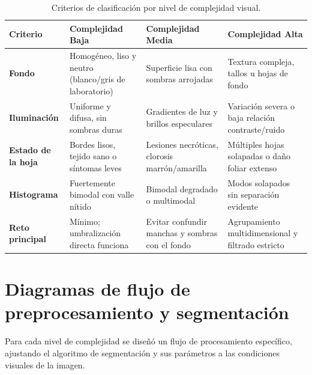 \documentclass[11pt,a4paper]{article}
\begin{document}
\begin{table}[H]
    \centering
    \renewcommand{\arraystretch}{1.4}
    \begin{tabular}{@{} >{\bfseries}p{2.8cm} p{3.8cm} p{3.8cm} p{3.8cm} @{}}
        \toprule
        Criterio
            & \textcolor{verde}{\textbf{Complejidad Baja}}
            & \textcolor{naranja}{\textbf{Complejidad Media}}
            & \textbf{Complejidad Alta} \\
        \midrule
        Fondo
            & Homogéneo, liso y neutro (blanco/gris de laboratorio)
            & Superficie lisa con sombras arrojadas
            & Textura compleja, tallos u hojas de fondo \\
        Iluminación
            & Uniforme y difusa, sin sombras duras
            & Gradientes de luz y brillos especulares
            & Variación severa o baja relación contraste/ruido \\
        Estado de la hoja
            & Bordes lisos, tejido sano o síntomas leves
            & Lesiones necróticas, clorosis marrón/amarilla
            & Múltiples hojas solapadas o daño foliar extenso \\
        Histograma
            & Fuertemente bimodal con valle nítido
            & Bimodal degradado o multimodal
            & Modos solapados sin separación evidente \\
        Reto principal
            & Mínimo; umbralización directa funciona
            & Evitar confundir manchas y sombras con el fondo
            & Agrupamiento multidimensional y filtrado estricto \\
        \bottomrule
    \end{tabular}
    \caption{Criterios de clasificación por nivel de complejidad visual.}
    \label{tab:complejidad}
\end{table}

\section{Diagramas de flujo de preprocesamiento y segmentación}

Para cada nivel de complejidad se diseñó un flujo de procesamiento específico,
ajustando el algoritmo de segmentación y sus parámetros a las condiciones
visuales de la imagen.

\end{document}
